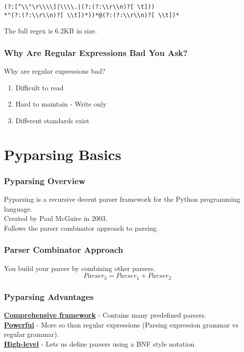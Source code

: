 \documentclass{beamer}
\begin{document}
\begin{frame}[fragile]
\begin{verbatim}
(?:[^\\"\r\\\\]|\\\\.|(?:(?:\\r\\n)?[ \t]))
*"(?:(?:\\r\\n)?[ \\t])*))*@(?:(?:\\r\\n)?[ \\t])*
\end{verbatim}
The full regex is 6.2KB in size.

\end{frame}


\begin{frame}[fragile]
\frametitle{Why Are Regular Expressions Bad You Ask?}
Why are regular expressions bad?

\begin{enumerate}
\pause
\item Difficult to read
\pause
\item Hard to maintain - Write only
\pause
\item Different standards exist
\end{enumerate}

\end{frame}

\section{Pyparsing Basics}

\begin{frame}
\frametitle{Pyparsing Overview}
Pyparsing is a recursive decent parser framework for the Python programming language. \\
\medskip
Created by Paul McGuire in 2003. \\
\medskip
Follows the parser combinator approach to parsing.
\end{frame}

\begin{frame}
\frametitle{Parser Combinator Approach}
You build your parser by combining other parsers.
$$Parser_3 = Parser_1 + Parser_2$$
\end{frame}

\begin{frame}
\frametitle{Pyparsing Advantages}

\textbf{\underline{Comprehensive framework}} - Contains many predefined parsers. \\
\medskip
\textbf{\underline{Powerful}} - More so than regular expressions (Parsing expression grammar vs regular grammar).\\
\bigskip
\textbf{\underline{High-level}} - Lets us define parsers using a BNF style notation.
\end{frame}
\end{document}
